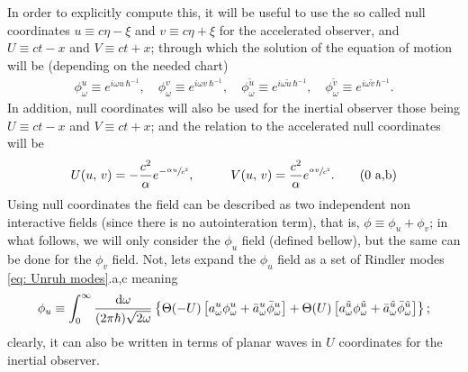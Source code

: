 In order to explicitly compute this, it will be useful to use the so called null coordinates $u\equiv c\eta-\xi$ and $v\equiv c\eta+\xi$ for the accelerated observer, and  $U\equiv ct-x$ and $V\equiv ct+x$; through which the solution of the equation of motion will be (depending on the needed chart)
\begin{subequations}\label{eq: Unruh modes}
	\begin{gather}
		\phi_\omega^u\equiv e^{i\omega u\,\hbar^{-1}},\quad \phi_\omega^v\equiv  e^{i\omega v\,\hbar^{-1}},\quad\phi_\omega^{\tilde u}\equiv e^{i\omega \tilde u\,\hbar^{-1}},\quad\phi_\omega^{\tilde v}\equiv  e^{i\omega \tilde v\,\hbar^{-1}}.\tag{\theequation \,\,a-d}
	\end{gather}
\end{subequations}
In addition, null coordinates will also be used for the inertial observer those being $U\equiv ct-x$ and $V\equiv ct+x$; and the relation to the accelerated null coordinates will be
\begin{subequations}\label{eq: Unruh Null coordinates relation}
	\begin{gather}
		U(u,\,v)=-\frac{c^2}{\alpha}e^{-\sfrac{\alpha u}{c^2}},\hspace{1.0cm} V(u,\,v)=\frac{c^2}{\alpha}e^{\sfrac{\alpha v}{c^2}}.\tag{\theequation \,\,a,b}
	\end{gather}
\end{subequations}
Using null coordinates the field can be described as two independent non interactive fields (since there is no autointeration term), that is, $\phi\equiv\phi_u+\phi_v$; in what follows, we will only consider the $\phi_u$ field (defined bellow), but the same can be done for the $\phi_v$ field. Not, lets expand the $\phi_u$ field as a set of Rindler modes \ref{eq: Unruh modes}.a,c meaning
\begin{equation}
	\phi_u\equiv\int_0^\infty \frac{\text{d} \omega}{(2\pi\hbar)\sqrt{2\omega}}\left\{\Theta(-U)\left[a^u_\omega\phi_\omega^u+\bar a^u_\omega\bar \phi_\omega^u \right]+\Theta(U)\left[a^{\tilde u}_\omega\phi_\omega^{\tilde u}+\bar a^{\tilde u}_\omega\bar \phi_\omega^{\tilde u} \right]\right\};
\end{equation}
clearly, it can also be written in terms of planar waves in $U$ coordinates for the inertial observer.

